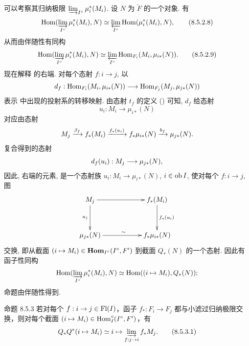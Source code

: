可以考察其归纳极限 $\varinjlim_{I^{\circ}}\mu_i^{\ast}(M_i)$.
设 $N$ 为 $\underleftarrow{F}$ 的一个对象.
有
\begin{equation*}
\operatorname{Hom}(\varinjlim_{I^{\circ}}\mu_i^{\ast}(M_i),N)\simeq
\varprojlim_{I^{\circ}}\operatorname{Hom}(\mu_i^{\ast}(M_i),N){},\tag{8.5.2.8}
\end{equation*}
从而由伴随性有同构
\begin{equation*}
\operatorname{Hom}(\varinjlim_{I^{\circ}}\mu_i^{\ast}(M_i),N)\simeq
\varprojlim_{I^{\circ}}\operatorname{Hom}_{F_i}(M_i,\mu_{i\ast}(N)){}.
\tag{8.5.2.9}
\end{equation*}
现在\pageoriginale{}解释  的右端.
对每个态射 $f:i\to j$, 以
$$
d_f:\Hom_{F_i}(M_i,\mu_{i\ast}(N))\to
\Hom_{F_j}(M_j,\mu_{j\ast}(N)){\quoi}
$$
表示 
中出现的投射系的转移映射.
由态射 $t_f$ 的定义
() 可知,
$d_f$ 给态射
$$
u_i:M_i\to\mu_{i\ast}(N)
$$
对应由态射
$$
M_j\xrightarrow{\beta_f}f_{\ast}(M_i)
\xrightarrow{f_{\ast}(u_i)}f_{\ast}\mu_{i\ast}(N)
\xrightarrow{b_f}\mu_{j\ast}(N){}.
$$
复合得到的态射
$$
d_f(u_i):M_j\to\mu_{j\ast}(N){\quoi},
$$
因此,  右端的元素,
是一个态射族 $u_i:M_i\to\mu_{i\ast}(N)$, $i\in\operatorname{ob} I$,
使对每个 $f:i\to j$, 图
\[
\xymatrix@C=2cm@R=1.25cm{
M_j\ar[r]\ar[d]_{u_j}&f_{\ast}(M_i)\ar[d]^{f_{\ast}(u_i)}\\
\mu_{j\ast}(N)\ar[r]^{\sim}&f_{\ast}\mu_{i\ast}(N)
}
\]
交换, 即从截面
$(i\mapsto M_i)\in\operatorname{\mathbf{Hom}}_{I^{\circ}}(I^{\circ},F')$
到截面 $Q_{\ast}(N)$ 的一个态射.
因此有函子性同构
$$
\operatorname{Hom}(\varinjlim_{I^{\circ}}\mu_i^{\ast}(M_i),N)
\simeq\operatorname{Hom}((i\mapsto M_i),Q_{\ast}(N)){};
$$
命题由伴随性得到.




\begin{enonce*}{命题 8.5.3}
若对每个 $f:i\to j\in\text{\rm Fl}(I)$，函子
$f_{\ast}:F_i\to F_j$ 都与小滤过归纳极限交换，则对每个截面
$(i\mapsto M_i)\in\operatorname{Hom}_I^{\circ}(I^{\circ},F')$，有
\begin{equation*}
Q_{\ast} Q^{\ast} (i \mapsto M_i) \simeq i \mapsto
\varinjlim_{f : j \to i} f_{\ast} M_j{\quoi}.\tag{8.5.3.1}
\end{equation*}
\end{enonce*}

